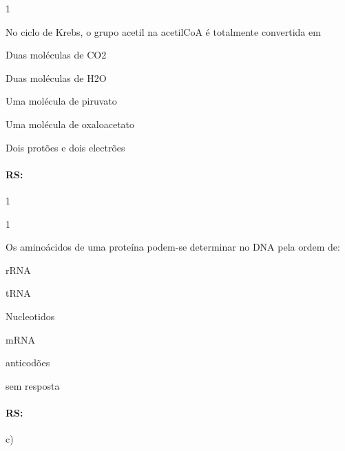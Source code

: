 \documentclass[\mainfilename]{subfiles}
\begin{document}
\begin{questionBox}1{}
    
    No ciclo de Krebs, o grupo acetil na  acetilCoA é totalmente convertida em
    \begin{enumerate}
        \begin{multicols}{2}
            \item Duas moléculas de CO2
            \item Duas moléculas de H2O
            \item Uma molécula de piruvato
            \item Uma molécula de oxaloacetato
            \item Dois protões e dois electrões
        \end{multicols}
    \end{enumerate}

    \paragraph{RS:} 1
    
\end{questionBox}

\begin{questionBox}1{}
    
    Os aminoácidos de uma proteína podem-se determinar no DNA pela ordem de:
    \begin{enumerate}[label={\alph*)}]
        \begin{multicols}{2}
            \item rRNA
            \item tRNA
            \item Nucleotidos
            \item mRNA
            \item anticodões
            \item sem resposta
        \end{multicols}
    \end{enumerate}

    \paragraph{RS:} c)
    
\end{questionBox}
\end{document}
